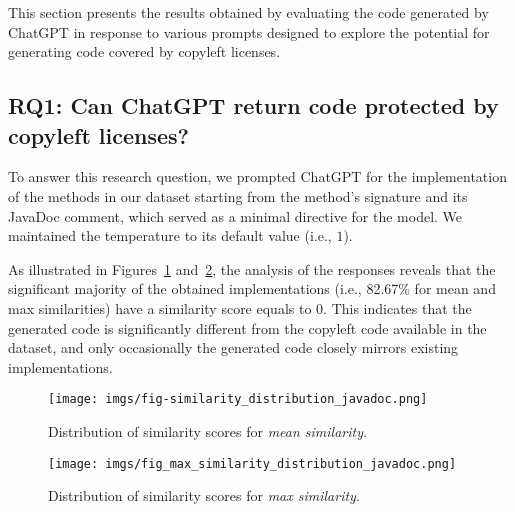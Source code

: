 \label{sec:Res}
This section presents the results obtained by evaluating the code generated by ChatGPT in response to various prompts designed to explore the potential for generating code covered by copyleft licenses. %

\subsection{RQ1: Can ChatGPT return code protected by copyleft licenses?}

To answer this research question, we prompted ChatGPT for the implementation of the methods in our dataset starting from the method's signature and its JavaDoc comment, which served as a minimal directive for the model. We maintained the temperature to its default value (i.e., $1$). 

As illustrated in Figures~\ref{fig:similarity_distribution} and~\ref{fig:max_similarity_distribution}, the analysis of the responses reveals that the significant majority of the obtained implementations (i.e., 82.67\% for mean and max similarities) have a similarity score equals to $0$. This indicates that the generated code is significantly different from the copyleft code available in the dataset, and only occasionally the generated code closely mirrors existing implementations.


\begin{figure} \centering \texttt{[image: imgs/fig-similarity\_distribution\_javadoc.png]} 
\vspace{-10pt} 

\caption{Distribution of similarity scores for \emph{mean similarity}.} \label{fig:similarity_distribution} 
\vspace{-5pt} 
\end{figure}

\begin{figure} 
\centering 
\texttt{[image: imgs/fig\_max\_similarity\_distribution\_javadoc.png]} 
\vspace{-10pt} 

\caption{Distribution of similarity scores for \emph{max similarity}.} 
\label{fig:max_similarity_distribution} 
\vspace{-5pt} 
\end{figure}



